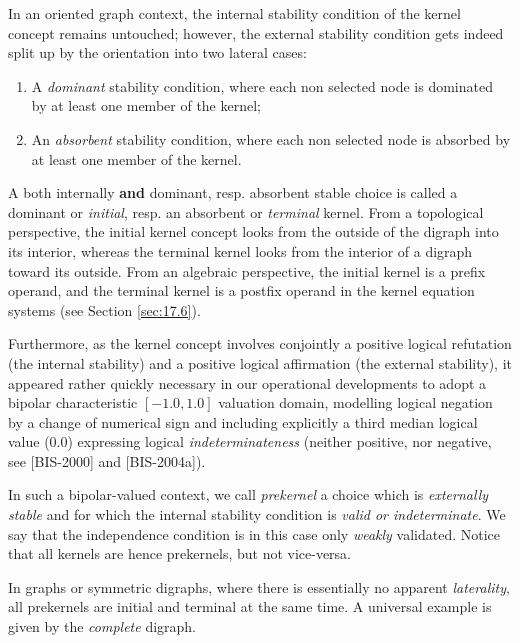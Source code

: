 In an oriented graph context, the internal stability condition of the kernel concept remains untouched; however, the external stability condition gets indeed split up by the orientation into two lateral cases:
\begin{enumerate}
\item A \emph{dominant} stability condition, where each non selected node is dominated by at least one member of the kernel;
\item An \emph{absorbent} stability condition, where each non selected node is absorbed by at least one member of the kernel.
\end{enumerate}
A both internally \textbf{and} dominant, resp. absorbent stable choice is called a dominant or \emph{initial}, resp. an absorbent or \emph{terminal} kernel. From a topological perspective, the initial kernel concept looks from the outside of the digraph into its interior, whereas the terminal kernel looks from the interior of a digraph toward its outside. From an algebraic perspective, the initial kernel is a prefix operand, and the terminal kernel is a postfix operand in the \Berge kernel equation systems (see Section \ref{sec:17.6}).

Furthermore, as the kernel concept involves conjointly a positive logical refutation (the internal stability) and a positive logical affirmation (the external stability), it appeared rather quickly necessary in our operational developments to adopt a bipolar characteristic $[-1.0,1.0]$ valuation domain, modelling logical negation by a change of numerical sign and including explicitly a third median logical value ($0.0$) expressing logical \emph{indeterminateness} (neither positive, nor negative, see [BIS-2000] and [BIS-2004a]).

In such a  bipolar-valued context, we call \emph{prekernel} a choice which is \emph{externally stable} and for which the internal stability condition is \emph{valid or indeterminate}. We say that the independence condition is in this case only \emph{weakly} validated. Notice that all kernels are hence prekernels, but not vice-versa.

In graphs or symmetric digraphs, where there is essentially no apparent \emph{laterality}, all prekernels are initial and terminal at the same time. A universal example is given by the \emph{complete} digraph.

